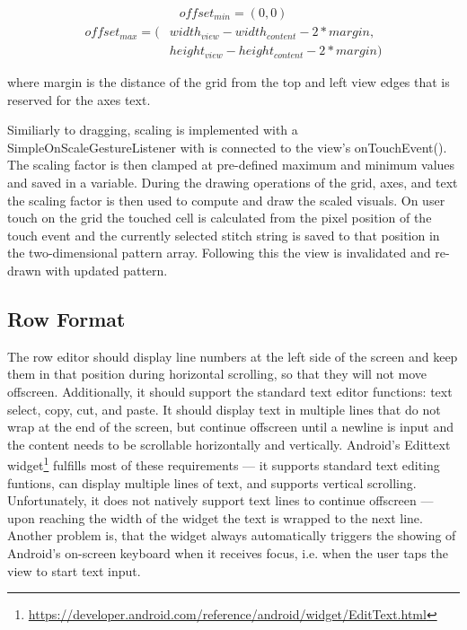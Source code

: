 \begin{gather*}
offset_{min} = (0, 0)
\end{gather*}
\begin{align*}
offset_{max} = (&width_{view} - width_{content} - 2 * margin, \\
				&height_{view} - height_{content} - 2 * margin)
\end{align*}

where margin is the distance of the grid from the top and left view edges that is reserved for the axes text.

Similiarly to dragging, scaling is implemented with a SimpleOnScaleGestureListener with is connected to the view's onTouchEvent(). The scaling factor is then clamped at pre-defined maximum and minimum values and saved in a variable. During the drawing operations of the grid, axes, and text the scaling factor is then used to compute and draw the scaled visuals. On user touch on the grid the touched cell is calculated from the pixel position of the touch event and the currently selected stitch string is saved to that position in the two-dimensional pattern array. Following this the view is invalidated and re-drawn with updated pattern.   

\subsection{Row Format}
\label{impl_row_format}
The row editor should display line numbers at the left side of the screen and keep them in that position during horizontal scrolling, so that they will not move offscreen. Additionally, it should support the standard text editor functions: text select, copy, cut, and paste. It should display text in multiple lines that do not wrap at the end of the screen, but continue offscreen until a newline is input and the content needs to be scrollable horizontally and vertically. Android's Edittext widget\footnote{\url{https://developer.android.com/reference/android/widget/EditText.html}} fulfills most of these requirements --- it supports standard text editing funtions, can display multiple lines of text, and supports vertical scrolling. Unfortunately, it does not natively support text lines to continue offscreen --- upon reaching the width of the widget the text is wrapped to the next line. Another problem is, that the widget always automatically triggers the showing of Android's on-screen keyboard when it receives focus, i.e. when the user taps the view to start text input. 


